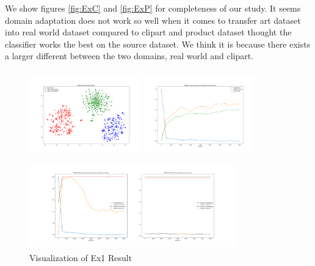 \documentclass[conference]{IEEEtran}
\begin{document}
We show figures \ref{fig:ExC} and \ref{fig:ExP} for completeness of our study. It seems domain adaptation does not work so well when it comes to transfer art dataset into real world dataset compared to clipart and product dataset thought the classifier works the best on the source dataset. We think it is because there exists a larger different between the two domains, real world and clipart.
\begin{figure}[htb]
\label{fig:Ex1}
\centering
\begin{minipage}[t]{0.3\textwidth}
\includegraphics[width=1.9in, height=1.5in]{Ladda/A2R_no_preassign_no_dec_no_bn/ADDA_visual.png}
\end{minipage}%
\begin{minipage}[t]{0.3\textwidth}
\includegraphics[width=1.9in, height=1.5in]{Ladda/A2R_no_preassign_no_dec_no_bn/clf.png}
\end{minipage}%
\begin{minipage}[t]{0.45\textwidth}
\includegraphics[width=3.5in, height=1.5in]{Ladda/A2R_no_preassign_no_dec_no_bn/gan.png}
\end{minipage}%
\caption{Visualization of Ex1 Result}
\end{figure}
\end{document}
